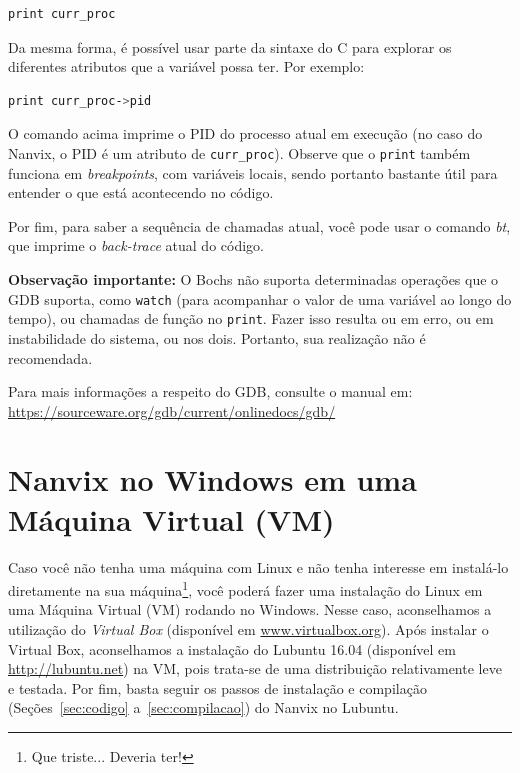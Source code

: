 \documentclass[11pt]{article}
\begin{document}
\begin{lstlisting}[language=sh,numbers=none,frame=single]
print curr_proc
\end{lstlisting}

Da mesma forma, é possível usar parte da sintaxe do C para explorar os diferentes atributos que a variável possa ter. Por exemplo:\\

\begin{lstlisting}[language=sh,numbers=none,frame=single]
print curr_proc->pid
\end{lstlisting}

O comando acima imprime o PID do processo atual em execução (no caso do Nanvix, o PID é um atributo de \texttt{curr\_proc}). Observe que o \texttt{print} também funciona em \textit{breakpoints}, com variáveis locais, sendo portanto bastante útil para entender o que está acontecendo no código.

Por fim, para saber a sequência de chamadas atual, você pode usar o comando \textit{bt}, que imprime o \textit{back-trace} atual do código.

\textbf{Observação importante:} O Bochs não suporta determinadas operações que o GDB suporta, como \texttt{watch} (para acompanhar o valor de uma variável ao longo do tempo), ou chamadas de função no \texttt{print}. Fazer isso resulta ou em erro, ou em instabilidade do sistema, ou nos dois. Portanto, sua realização não é recomendada. 

Para mais informações a respeito do GDB, consulte o manual em: \url{https://sourceware.org/gdb/current/onlinedocs/gdb/}

\section{Nanvix no Windows em uma Máquina Virtual (VM)}
\label{sec:vm}

Caso você não tenha uma máquina com Linux e não tenha interesse em instalá-lo diretamente na sua máquina\footnote{Que triste... Deveria ter!}, você poderá fazer uma instalação do Linux em uma Máquina Virtual (VM) rodando no Windows. Nesse caso, aconselhamos a utilização do \textit{Virtual Box}
(disponível em \url{www.virtualbox.org}). Após instalar o Virtual Box, aconselhamos a instalação do Lubuntu 16.04 (disponível em \url{http://lubuntu.net}) na VM, pois trata-se de uma distribuição relativamente leve e testada. Por fim, basta seguir os passos de instalação e compilação (Seções~\ref{sec:codigo} a~\ref{sec:compilacao}) do Nanvix no Lubuntu.
\end{document}
